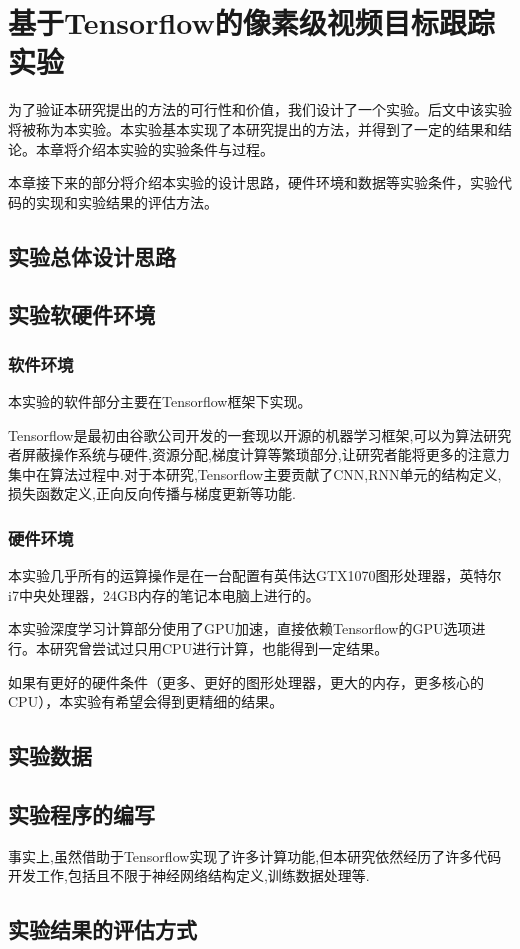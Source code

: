 \chapter{基于Tensorflow的像素级视频目标跟踪实验}
为了验证本研究提出的方法的可行性和价值，我们设计了一个实验。后文中该实验将被称为本实验。本实验基本实现了本研究提出的方法，并得到了一定的结果和结论。本章将介绍本实验的实验条件与过程。
\par
本章接下来的部分将介绍本实验的设计思路，硬件环境和数据等实验条件，实验代码的实现和实验结果的评估方法。

\section{实验总体设计思路}


\section{实验软硬件环境}
\subsection{软件环境}
本实验的软件部分主要在Tensorflow\supercite{abadi2016tensorflow}框架下实现。
\par
Tensorflow是最初由谷歌公司开发的一套现以开源的机器学习框架,可以为算法研究者屏蔽操作系统与硬件,资源分配,梯度计算等繁琐部分,让研究者能将更多的注意力集中在算法过程中.对于本研究,Tensorflow主要贡献了CNN,RNN单元的结构定义,损失函数定义,正向反向传播与梯度更新等功能.
\par

\subsection{硬件环境}
本实验几乎所有的运算操作是在一台配置有英伟达GTX1070图形处理器，英特尔i7中央处理器，24GB内存的笔记本电脑上进行的。
\par
本实验深度学习计算部分使用了GPU加速，直接依赖Tensorflow的GPU选项进行。本研究曾尝试过只用CPU进行计算，也能得到一定结果。
\par
如果有更好的硬件条件（更多、更好的图形处理器，更大的内存，更多核心的CPU），本实验有希望会得到更精细的结果。

\section{实验数据}


\section{实验程序的编写}
事实上,虽然借助于Tensorflow实现了许多计算功能,但本研究依然经历了许多代码开发工作,包括且不限于神经网络结构定义,训练数据处理等.

\section{实验结果的评估方式}